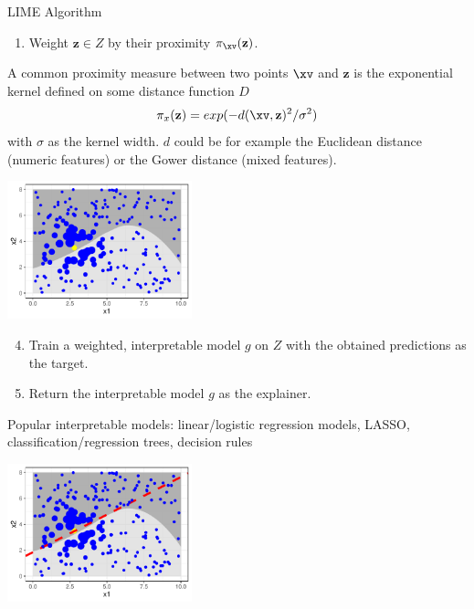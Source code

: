 \documentclass[11pt,compress,t,notes=noshow, xcolor=table]{beamer}
\newcommand{\neigh}{\pi_{\xv}}
\newcommand{\zv}{\mathbf{z}}
\begin{document}
\begin{vbframe}{LIME Algorithm}
\begin{enumerate}
		\framebreak
		\item Weight $\zv \in Z$ by their proximity $\neigh(\zv)$.
		\\[0.2cm]
		\end{enumerate}
		 A common proximity measure between two points $\xv$ and $\zv$ is the exponential kernel defined on some distance function $D$
		 $$\pi_x(\zv) = exp(-d(\xv, \zv)^2/\sigma^2)$$ 
		 with $\sigma$ as the kernel width. $d$ could be for example the Euclidean distance (numeric features) or the Gower distance (mixed features).
		\begin{center}
			\includegraphics[width=0.4\textwidth]{figure/lime4}
		\end{center}
		
		\framebreak
		\begin{enumerate}
			\setcounter{enumi}{3}
		\item Train a weighted, interpretable model $g$ on $Z$ with the obtained predictions as the target.
		\item Return the interpretable model $g$ as the explainer. \\[0.3cm]
			\end{enumerate}
		Popular interpretable models: linear/logistic regression models, LASSO, classification/regression trees, decision rules
					\vspace{1cm}
		\begin{center}
			\includegraphics[width=0.4\textwidth]{figure/lime5}
		\end{center}
\end{vbframe}
\end{document}
